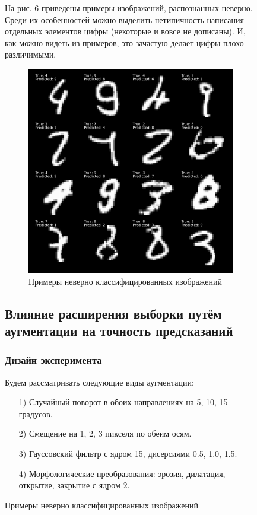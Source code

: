 \documentclass{article}
\begin{document}
\begin{figure}[H]
                На рис. 6 приведены примеры изображений, распознанных неверно.
                Среди их особенностей можно выделить нетипичность написания отдельных элементов цифры (некоторые и вовсе не дописаны).
                И, как можно видеть из примеров, это зачастую делает цифры плохо различимыми.
                \begin{figure}[H]
                    \centering
                    \includegraphics[width=0.8\linewidth]{./pictures/WrongExamples.pdf}
                    \caption{Примеры неверно классифицированных изображений}
                    \label{fig:mpr}
                \end{figure}

        \subsection{Влияние расширения выборки путём аугментации на точность предсказаний}
            \subsubsection{Дизайн эксперимента}
                Будем рассматривать следующие виды аугментации:
                \begin{enumerate}
                    \item[1)] Случайный поворот в обоих направлениях на 5, 10, 15 градусов.
                    \item[2)] Смещение на 1, 2, 3 пикселя по обеим осям.
                    \item[3)] Гауссовский фильтр с ядром 15, дисерсиями 0.5, 1.0, 1.5.
                    \item[4)] Морфологические преобразования: эрозия, дилатация, открытие, закрытие с ядром 2.
                \end{enumerate}


\end{figure}
\end{document}
